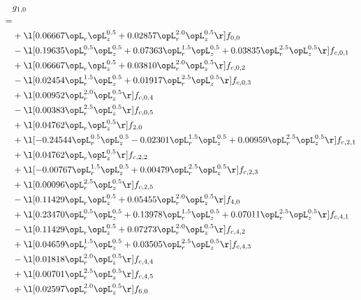 \begin{alignat}{2} 
\label{eq:g_10_0} 
& g_{1,0} \nonumber \\ 
 = \\ 
& + \l[  0.06667 \opL_r \opL_z^{0.5} +  0.02857 \opL_r^{2.0} \opL_z^{0.5}  \r] f_{0,0} \nonumber \\ 
& - \l[  0.19635 \opL_r^{0.5} \opL_z^{0.5} +  0.07363 \opL_r^{1.5} \opL_z^{0.5} +  0.03835 \opL_r^{2.5} \opL_z^{0.5}  \r] f_{c,0,1} \nonumber \\ 
& + \l[  0.06667 \opL_r \opL_z^{0.5} +  0.03810 \opL_r^{2.0} \opL_z^{0.5}  \r] f_{c,0,2} \nonumber \\ 
& - \l[  0.02454 \opL_r^{1.5} \opL_z^{0.5} +  0.01917 \opL_r^{2.5} \opL_z^{0.5}  \r] f_{c,0,3} \nonumber \\ 
& + \l[  0.00952 \opL_r^{2.0} \opL_z^{0.5}  \r] f_{c,0,4} \nonumber \\ 
& - \l[  0.00383 \opL_r^{2.5} \opL_z^{0.5}  \r] f_{c,0,5} \nonumber \\ 
& + \l[  0.04762 \opL_r \opL_z^{0.5}  \r] f_{2,0} \nonumber \\ 
& + \l[  -0.24544 \opL_r^{0.5} \opL_z^{0.5}   -0.02301 \opL_r^{1.5} \opL_z^{0.5} +  0.00959 \opL_r^{2.5} \opL_z^{0.5}  \r] f_{c,2,1} \nonumber \\ 
& + \l[  0.04762 \opL_r \opL_z^{0.5}  \r] f_{c,2,2} \nonumber \\ 
& + \l[  -0.00767 \opL_r^{1.5} \opL_z^{0.5} +  0.00479 \opL_r^{2.5} \opL_z^{0.5}  \r] f_{c,2,3} \nonumber \\ 
& + \l[  0.00096 \opL_r^{2.5} \opL_z^{0.5}  \r] f_{c,2,5} \nonumber \\ 
& - \l[  0.11429 \opL_r \opL_z^{0.5} +  0.05455 \opL_r^{2.0} \opL_z^{0.5}  \r] f_{4,0} \nonumber \\ 
& + \l[  0.23470 \opL_r^{0.5} \opL_z^{0.5} +  0.13978 \opL_r^{1.5} \opL_z^{0.5} +  0.07011 \opL_r^{2.5} \opL_z^{0.5}  \r] f_{c,4,1} \nonumber \\ 
& - \l[  0.11429 \opL_r \opL_z^{0.5} +  0.07273 \opL_r^{2.0} \opL_z^{0.5}  \r] f_{c,4,2} \nonumber \\ 
& + \l[  0.04659 \opL_r^{1.5} \opL_z^{0.5} +  0.03505 \opL_r^{2.5} \opL_z^{0.5}  \r] f_{c,4,3} \nonumber \\ 
& - \l[  0.01818 \opL_r^{2.0} \opL_z^{0.5}  \r] f_{c,4,4} \nonumber \\ 
& + \l[  0.00701 \opL_r^{2.5} \opL_z^{0.5}  \r] f_{c,4,5} \nonumber \\ 
& + \l[  0.02597 \opL_r^{2.0} \opL_z^{0.5}  \r] f_{6,0} \nonumber \\ 

\end{alignat}
